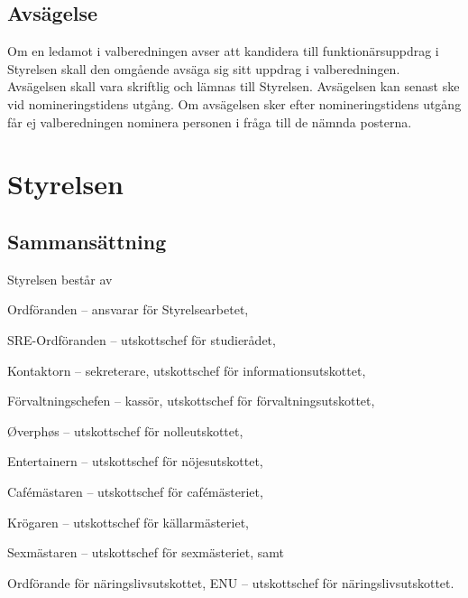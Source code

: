 \documentclass[10pt]{article}
\begin{document}
\subsection{Avsägelse}
Om en ledamot i valberedningen avser att kandidera till funktionärsuppdrag
i Styrelsen skall den omgående avsäga sig sitt
uppdrag i valberedningen. Avsägelsen skall vara skriftlig och lämnas till
Styrelsen. Avsägelsen kan senast ske vid nomineringstidens
utgång. Om avsägelsen sker efter nomineringstidens utgång får ej
valberedningen nominera personen i fråga till de nämnda posterna.

\section{Styrelsen}
\subsection{Sammansättning}
Styrelsen består av
\begin{alphlist}
    \item Ordföranden -- ansvarar för Styrelsearbetet,
    \item SRE-Ordföranden -- utskottschef för studierådet,
    \item Kontaktorn -- sekreterare, utskottschef för informationsutskottet,
    \item Förvaltningschefen -- kassör, utskottschef för förvaltningsutskottet,
    \item Øverphøs -- utskottschef för nolleutskottet,
    \item Entertainern -- utskottschef för nöjesutskottet,
    \item Cafémästaren -- utskottschef för cafémästeriet,
    \item Krögaren -- utskottschef för källarmästeriet,
    \item Sexmästaren -- utskottschef för sexmästeriet, samt
    \item Ordförande för näringslivsutskottet, ENU
        -- utskottschef för näringslivsutskottet.
\end{alphlist}
\end{document}
